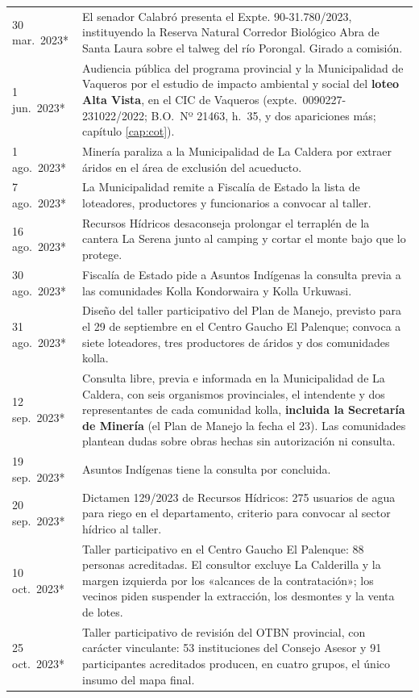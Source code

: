 \begin{longtable}{@{}p{2.7cm}p{10.3cm}@{}}
30 mar.\ 2023* & El senador Calabró presenta el Expte. 90-31.780/2023, instituyendo la Reserva Natural Corredor Biológico Abra de Santa Laura sobre el talweg del río Porongal. Girado a comisión. \\
1 jun.\ 2023* & Audiencia pública del programa provincial y la Municipalidad de Vaqueros por el estudio de impacto ambiental y social del \textbf{loteo Alta Vista}, en el CIC de Vaqueros (expte.\ 0090227-231022/2022; B.O.\ Nº 21463, h.\ 35, y dos apariciones más; capítulo \ref{cap:cot}). \\
1 ago.\ 2023* & Minería paraliza a la Municipalidad de La Caldera por extraer áridos en el área de exclusión del acueducto. \\
7 ago.\ 2023* & La Municipalidad remite a Fiscalía de Estado la lista de loteadores, productores y funcionarios a convocar al taller. \\
16 ago.\ 2023* & Recursos Hídricos desaconseja prolongar el terraplén de la cantera La Serena junto al camping y cortar el monte bajo que lo protege. \\
30 ago.\ 2023* & Fiscalía de Estado pide a Asuntos Indígenas la consulta previa a las comunidades Kolla Kondorwaira y Kolla Urkuwasi. \\
31 ago.\ 2023* & Diseño del taller participativo del Plan de Manejo, previsto para el 29 de septiembre en el Centro Gaucho El Palenque; convoca a siete loteadores, tres productores de áridos y dos comunidades kolla. \\
12 sep.\ 2023* & Consulta libre, previa e informada en la Municipalidad de La Caldera, con seis organismos provinciales, el intendente y dos representantes de cada comunidad kolla, \textbf{incluida la Secretaría de Minería} (el Plan de Manejo la fecha el 23). Las comunidades plantean dudas sobre obras hechas sin autorización ni consulta. \\
19 sep.\ 2023* & Asuntos Indígenas tiene la consulta por concluida. \\
20 sep.\ 2023* & Dictamen 129/2023 de Recursos Hídricos: 275 usuarios de agua para riego en el departamento, criterio para convocar al sector hídrico al taller. \\
10 oct.\ 2023* & Taller participativo en el Centro Gaucho El Palenque: 88 personas acreditadas. El consultor excluye La Calderilla y la margen izquierda por los «alcances de la contratación»; los vecinos piden suspender la extracción, los desmontes y la venta de lotes. \\
25 oct.\ 2023* & Taller participativo de revisión del OTBN provincial, con carácter vinculante: 53 instituciones del Consejo Asesor y 91 participantes acreditados producen, en cuatro grupos, el único insumo del mapa final. \\

\end{longtable}
